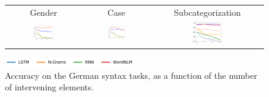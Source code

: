 
\begin{figure}
	\begin{tabular}{ccc}
Gender & Case & Subcategorization \\
\includegraphics[width=0.28\textwidth]{figures/german-gender-total.pdf} 
		&
		\includegraphics[width=0.28\textwidth]{figures/german-case-total.pdf}
		&
\includegraphics[width=0.28\textwidth]{figures/german-prep-with-control.pdf}
	\end{tabular}
\centering\includegraphics[width=0.5\textwidth]{figures/german-legend.pdf}
\caption{Accuracy on the German syntax tasks, as a function of the number of intervening elements.}\label{fig:german-syntax}
\end{figure}



